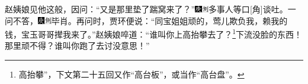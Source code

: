 赵姨娘见他这般，因问：“又是那里垫了踹窝来了？”{\includegraphics[width=3mm]{../Images/00004}\includegraphics[width=3mm]{../Images/00011}\footnotesize \kaishu 多事人等口{[}角{]}谈吐。}一问不答，{\includegraphics[width=3mm]{../Images/00004}\includegraphics[width=3mm]{../Images/00011}\footnotesize \kaishu 毕肖。}再问时，贾环便说：“同宝姐姐顽的，莺儿欺负我，赖我的钱，宝玉哥哥撵我来了。”赵姨娘啐道：“谁叫你上高抬攀去了？\footnote{高抬攀”，下文第二十五回又作“高台板”，或当作“高台盘”。}下流没脸的东西！那里顽不得？谁叫你跑了去讨没意思！”

